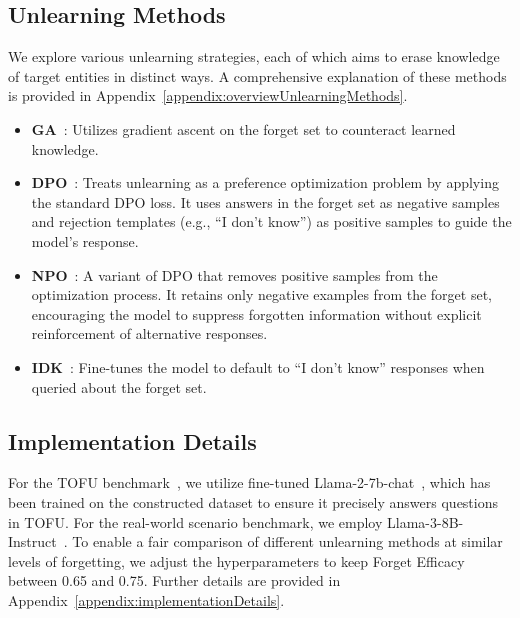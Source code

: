 \subsection{Unlearning Methods}
We explore various unlearning strategies, each of which aims to erase knowledge of target entities in distinct ways. A comprehensive explanation of these methods is provided in Appendix~\ref{appendix:overviewUnlearningMethods}.
\begin{itemize}[leftmargin=6pt]
    \item \textbf{GA}~\cite{jang2023knowledgeunlearning}: Utilizes gradient ascent on the forget set to counteract learned knowledge.
    \item \textbf{DPO}~\cite{rafailov2023dpo}: Treats unlearning as a preference optimization problem by applying the standard DPO loss. It uses answers in the forget set as negative samples and rejection templates (e.g., ``I don't know'') as positive samples to guide the model's response.
    \item \textbf{NPO}~\cite{zhang2024npo}: A variant of DPO that removes positive samples from the optimization process. It retains only negative examples from the forget set, encouraging the model to suppress forgotten information without explicit reinforcement of alternative responses.
    \item \textbf{IDK}~\cite{maini2024tofu}: Fine-tunes the model to default to ``I don't know'' responses when queried about the forget set.
\end{itemize}


\subsection{Implementation Details}
For the TOFU benchmark~\citep{maini2024tofu}, we utilize fine-tuned Llama-2-7b-chat~\citep{touvron2023llama2}, which has been trained on the constructed dataset to ensure it precisely answers questions in TOFU. For the real-world scenario benchmark, we employ Llama-3-8B-Instruct~\citep{dubey2024llama3}.
\noindent
To enable a fair comparison of different unlearning methods at similar levels of forgetting, we adjust the hyperparameters to keep Forget Efficacy between 0.65 and 0.75. Further details are provided in Appendix~\ref{appendix:implementationDetails}.
